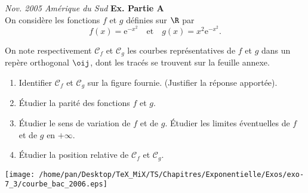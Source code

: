 \begin{exercice}

 \textsl{Nov. 2005 Am\'erique du Sud} \textbf{Ex. Partie A}\\
On consid\`ere les fonctions $f$ et $g$ d\'efinies sur $\R$ par
\[ f(x) = \text{e}^{-x^2} \quad  \text{et}\quad  g(x) = x^2\text{e}^{-x^2}.\]

On note respectivement $\mathcal{C}_{f}$ et $\mathcal{C}_{g}$ les courbes repr\'esentatives de $f$ et $g$ dans un rep\`ere orthogonal $\oij$, dont les trac\'es se trouvent sur la feuille annexe.

\begin{enumerate}
\item  Identifier $\mathcal{C}_{f}$ et $\mathcal{C}_{g}$ sur la figure fournie. (Justifier la r\'eponse apport\'ee).
\item \'Etudier la parit\'e des fonctions $f$ et $g$.
\item \'Etudier le sens de variation de $f$ et de $g$. \'Etudier les limites \'eventuelles de $f$ et de $g$ en $+\infty$.
\item \'Etudier la position relative de $\mathcal{C}_{f}$ et $\mathcal{C}_{g}$.
 \end{enumerate}
\texttt{[image: /home/pan/Desktop/TeX\_MiX/TS/Chapitres/Exponentielle/Exos/exo-7\_3/courbe\_bac\_2006.eps]}
\end{exercice}
